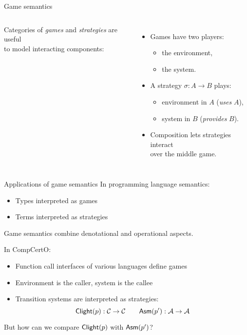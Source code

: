 \documentclass[aspectratio=169,mathserif]{beamer}
\begin{document}
\begin{frame}[fragile]{Game semantics} %
  \begin{columns}
    Categories of \emph{games} and \emph{strategies}
    are useful \\ to model interacting components:
    \begin{itemize}
      \item Games have two players:
        \begin{itemize}
          \item the environment,
          \item the system.
        \end{itemize}
      \item<2-> A strategy $\sigma : A \rightarrow B$ plays:
        \begin{itemize}
          \item environment in $A$ (\emph{uses} $A$),
          \item system in $B$ (\emph{provides} $B$).
        \end{itemize}
        \pause
      \item<3-> Composition lets strategies interact \\
        over the middle game.
    \end{itemize}

  \end{columns}
\end{frame}

\begin{frame}{Applications of game semantics} %
In programming language semantics:
\begin{itemize}
  \item Types interpreted as games
  \item Terms interpreted as strategies
\end{itemize}
Game semantics combine denotational and operational aspects.

\pause
\vspace{1em}
In CompCertO:
\begin{itemize}
  \item Function call interfaces of various languages define games
  \item Environment is the caller, system is the callee
  \item Transition systems are interpreted as strategies:
    \[  \mathsf{Clight} (p) : \mathcal{C} \rightarrow \mathcal{C} \qquad
        \mathsf{Asm} (p') : \mathcal{A} \rightarrow \mathcal{A} \]
\end{itemize}
\pause
But how can we compare $ \mathsf{Clight} (p)$ with $ \mathsf{Asm} (p')$?

\end{frame}
\end{document}

